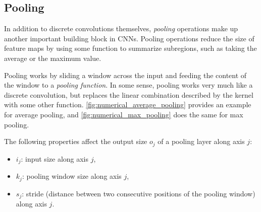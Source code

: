\subsection{Pooling}\label{sec:pooling}

In addition to discrete convolutions themselves, {\em pooling\/} operations
make up another important building block in CNNs. Pooling operations reduce
the size of feature maps by using some function to summarize subregions, such
as taking the average or the maximum value.

Pooling works by sliding a window across the input and feeding the content of
the window to a {\em pooling function}. In some sense, pooling works very much
like a discrete convolution, but replaces the linear combination described by
the kernel with some other function. \autoref{fig:numerical_average_pooling}
provides an example for average pooling, and \autoref{fig:numerical_max_pooling}
does the same for max pooling.

The following properties affect the output size $o_j$ of a pooling layer
along axis $j$:

\begin{itemize}
    \item $i_j$: input size along axis $j$,
    \item $k_j$: pooling window size along axis $j$,
    \item $s_j$: stride (distance between two consecutive positions of the
        pooling window) along axis $j$.
\end{itemize}

